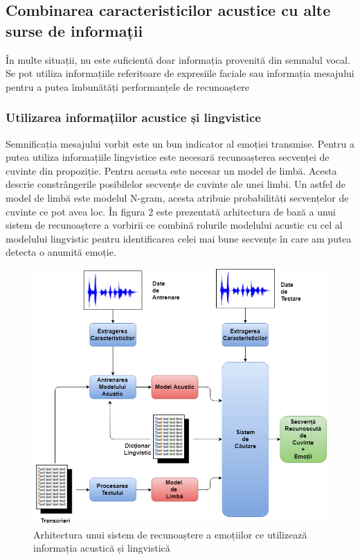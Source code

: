 \documentclass[9pt,shortpaper,twoside,web]{ieeecolor}
\begin{document}
\subsection{Combinarea caracteristicilor acustice cu alte surse de informații}
În multe situații, nu este suficientă doar informația provenită din semnalul vocal. Se pot utiliza informațiile referitoare de expresiile faciale sau informația mesajului pentru a putea îmbunătăți performanțele de recunoaștere


\subsubsection{Utilizarea informațiilor acustice și lingvistice}
Semnificația mesajului vorbit este un bun indicator al emoției transmise. Pentru a putea utiliza informațiile lingvistice este necesară recunoașterea secvenței de cuvinte din propoziție. Pentru aceasta este necesar un model de limbă. Acesta descrie constrângerile posibilelor secvențe de cuvinte ale unei limbi. Un astfel de model de limbă este modelul N-gram, acesta atribuie probabilități secvențelor de cuvinte ce pot avea loc. În figura 2 este prezentată arhitectura de bază a unui sistem de recunoaștere a vorbirii ce combină rolurile modelului acustic cu cel al modelului lingvistic pentru identificarea celei mai bune secvențe în care am putea detecta o anumită emoție.

\begin{figure}[htb]
\includegraphics[width=\columnwidth]{res/fig/arhitectura-modelL-modelA}
\caption{Arhitectura unui sistem de recunoaștere a emoțiilor ce utilizează informația acustică și lingvistică}
\label{fig3}
\end{figure}
\end{document}
